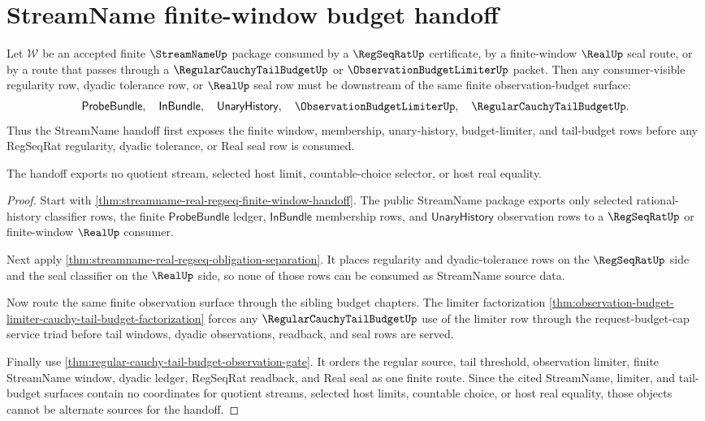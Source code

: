 \section{StreamName finite-window budget handoff}
\label{sec:streamname-real-regseq-finite-window-budget-handoff}

\begin{theorem}
\label{thm:streamname-real-regseq-finite-window-budget-handoff}
Let $\mathcal W$ be an accepted finite $\StreamNameUp$ package consumed by a
$\RegSeqRatUp$ certificate, by a finite-window $\RealUp$ seal route, or by a
route that passes through a $\RegularCauchyTailBudgetUp$ or
$\ObservationBudgetLimiterUp$ packet. Then any consumer-visible regularity
row, dyadic tolerance row, or $\RealUp$ seal row must be downstream of the same
finite observation-budget surface:
$$
\mathsf{ProbeBundle},\quad \mathsf{InBundle},\quad
\mathsf{UnaryHistory},\quad \ObservationBudgetLimiterUp,\quad
\RegularCauchyTailBudgetUp.
$$
Thus the StreamName handoff first exposes the finite window, membership,
unary-history, budget-limiter, and tail-budget rows before any RegSeqRat
regularity, dyadic tolerance, or Real seal row is consumed.

The handoff exports no quotient stream, selected host limit, countable-choice
selector, or host real equality.
\end{theorem}
\begin{proof}
Start with \autoref{thm:streamname-real-regseq-finite-window-handoff}. The
public StreamName package exports only selected rational-history classifier
rows, the finite $\mathsf{ProbeBundle}$ ledger, $\mathsf{InBundle}$ membership
rows, and $\mathsf{UnaryHistory}$ observation rows to a $\RegSeqRatUp$ or
finite-window $\RealUp$ consumer.

Next apply
\autoref{thm:streamname-real-regseq-obligation-separation}. It places
regularity and dyadic-tolerance rows on the $\RegSeqRatUp$ side and the seal
classifier on the $\RealUp$ side, so none of those rows can be consumed as
StreamName source data.

Now route the same finite observation surface through the sibling budget
chapters. The limiter factorization
\autoref{thm:observation-budget-limiter-cauchy-tail-budget-factorization}
forces any $\RegularCauchyTailBudgetUp$ use of the limiter row through the
request-budget-cap service triad before tail windows, dyadic observations,
readback, and seal rows are served.

Finally use
\autoref{thm:regular-cauchy-tail-budget-observation-gate}. It orders the
regular source, tail threshold, observation limiter, finite StreamName window,
dyadic ledger, RegSeqRat readback, and Real seal as one finite route. Since
the cited StreamName, limiter, and tail-budget surfaces contain no coordinates
for quotient streams, selected host limits, countable choice, or host real
equality, those objects cannot be alternate sources for the handoff.
\end{proof}

